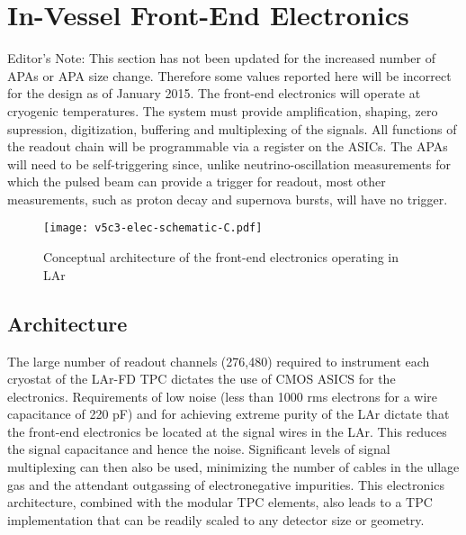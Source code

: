 \section{In-Vessel Front-End Electronics }
\label{sec:v5-tpc-elec}

\notestart
Editor's Note:  This section has not been updated for the increased number of APAs or APA size change.  Therefore some values reported here will be incorrect for the design as of January 2015. 
\notestop
The front-end electronics will operate at cryogenic temperatures. The system must provide 
amplification, shaping, zero supression, digitization, buffering and multiplexing of the signals.  All functions of the readout chain will be programmable via a register on the ASICs. The APAs will need to be
self-triggering since, unlike neutrino-oscillation measurements for which the pulsed beam 
can provide a trigger for readout, most other measurements, such as proton decay
and supernova bursts, will have no trigger.  

 
\begin{figure}[htbp]
\centering
\texttt{[image: v5c3-elec-schematic-C.pdf]}
\caption{Conceptual architecture of the front-end electronics operating in LAr}
\label{fig:tpc-elec-schematic}
\end{figure}

\subsection{Architecture}
\label{subsec:fe-arch}

The large number of readout channels (276,480) required to instrument
each cryostat of the LAr-FD TPC dictates the use of CMOS ASICS for the electronics. 
Requirements of low noise (less than 1000 rms electrons for a wire
capacitance of 220 pF) and for achieving extreme purity of the LAr dictate that
the front-end electronics be located at the signal wires in the LAr.  This
reduces the signal capacitance and hence the noise. Significant levels of 
signal multiplexing can then also be used, minimizing the number of cables
in the ullage gas and the attendant 
outgassing of electronegative impurities.
This electronics
architecture, combined with the modular TPC elements, also leads to a
TPC implementation that can be readily scaled to any detector size or
geometry.

